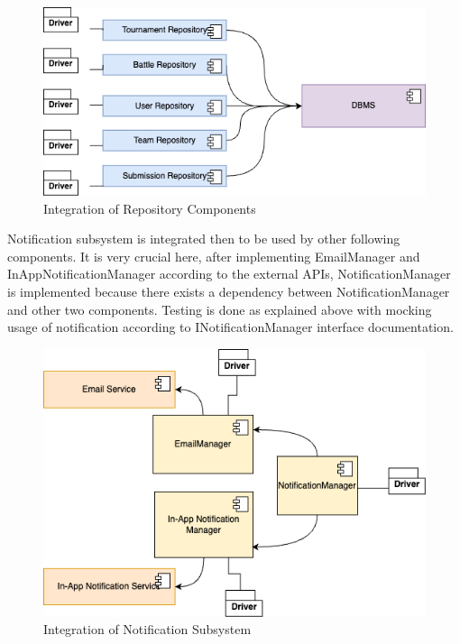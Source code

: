 \begin{figure}[H]
    \centering
    \includegraphics[width=\linewidth]{Images/integration/integration_1.drawio.png}
    \caption{Integration of Repository Components}
\end{figure}

\newpage
\indent Notification subsystem is integrated then to be used by other following components. It is very crucial here, after implementing EmailManager and InAppNotificationManager according to the external APIs, NotificationManager is implemented because there exists a dependency between NotificationManager and other two components. Testing is done as explained above with mocking usage of notification according to INotificationManager interface documentation. 

\begin{figure}[H]
    \centering
    \includegraphics[width=\linewidth]{Images/integration/integration_2.drawio.png}
    \caption{Integration of Notification Subsystem}
\end{figure}

